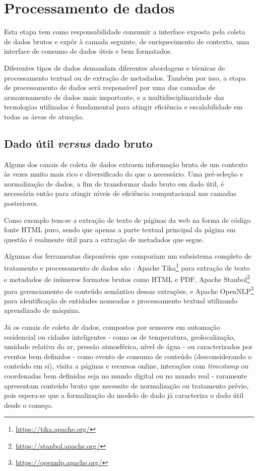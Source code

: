 \chapter{Processamento de dados} \label{c:processamento_de_dados}

Esta etapa tem como responsabilidade consumir a interface exposta pela coleta de dados brutos e expôr à camada seguinte, de enriquecimento de contexto, uma interface de consumo de dados úteis e bem formatados.

Diferentes tipos de dados demandam diferentes abordagens e técnicas de processamento textual ou de extração de metadados. Também por isso, a etapa de processamento de dados será responsável por uma das camadas de armazenamento de dados mais importante, e a multidisciplinaridade das tecnologias utilizadas é fundamental para atingir eficiência e escalabilidade em todas as áreas de atuação.

\section{Dado útil \textit{versus} dado bruto} \label{s:dado_util_vs_dado_bruto}

Alguns dos canais de coleta de dados extraem informação bruta de um contexto às vezes muito mais rico e diversificado do que o necessário. Uma pré-seleção e normalização de dados, a fim de transformar dado bruto em dado útil, é necessária então para atingir níveis de eficiência computacional nas camadas posteriores.

Como exemplo tem-se a extração de texto de páginas da web na forma de código fonte HTML puro, sendo que apenas a parte textual principal da página em questão é realmente útil para a extração de metadados que segue.

Algumas das ferramentas disponíveis que comporiam um subsistema completo de tratamento e processamento de dados são \cite{ital:jung-andrew}: Apache Tika\footnote{\url{https://tika.apache.org/}} para extração de texto e metadados de inúmeros formatos brutos como HTML e PDF, Apache Stanbol\footnote{\url{https://stanbol.apache.org/}} para gerenciamento de conteúdo semântico dessas extrações, e Apache OpenNLP\footnote{\url{https://opennlp.apache.org/}} para identificação de entidades nomeadas e processamento textual utilizando aprendizado de máquina.

Já os canais de coleta de dados, compostos por sensores em automação residencial ou cidades inteligentes - como os de temperatura, geolocalização, umidade relativa do ar, pressão atmosférica, nível de água - ou caracterizados por eventos bem definidos - como evento de consumo de conteúdo (desconsiderando o conteúdo em si), visita a páginas e recursos online, interações com \textit{timestamp} ou coordenadas bem definidas seja no mundo digital ou no mundo real - raramente apresentam conteúdo bruto que necessite de normalização ou tratamento prévio, pois espera-se que a formalização do modelo de dado já caracteriza o dado útil desde o começo.

